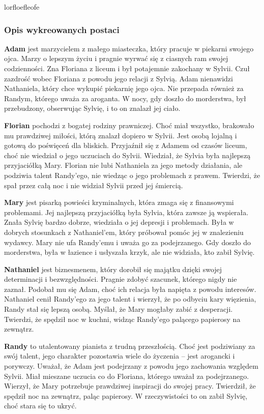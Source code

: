 lorfloefleofe

\subsubsection*{Opis wykreowanych postaci}

\textbf{Adam} jest marzycielem z małego miasteczka, który pracuje w piekarni swojego ojca. Marzy o lepszym 
życiu i pragnie wyrwać się z ciasnych ram swojej codzienności. Zna Floriana z liceum i był 
potajemnie zakochany w Sylvii. Czuł zazdrość wobec Floriana z powodu jego relacji z Sylvią. 
Adam nienawidzi Nathaniela, który chce wykupić piekarnię jego ojca. Nie przepada również za 
Randym, którego uważa za aroganta. W nocy, gdy doszło do morderstwa, był przebudzony, obserwując 
Sylvię, i to on znalazł jej ciało.

\textbf{Florian} pochodzi z bogatej rodziny prawniczej. Choć miał wszystko, brakowało mu prawdziwej miłości, 
którą znalazł dopiero w Sylvii. Jest osobą lojalną i gotową do poświęceń dla bliskich. Przyjaźnił 
się z Adamem od czasów liceum, choć nie wiedział o jego uczuciach do Sylvii. Wiedział, że Sylvia 
była najlepszą przyjaciółką Mary. Florian nie lubi Nathaniela za jego metody działania, ale 
podziwia talent Randy'ego, nie wiedząc o jego problemach z prawem. Twierdzi, że spał przez całą 
noc i nie widział Sylvii przed jej śmiercią.

\textbf{Mary} jest pisarką powieści kryminalnych, która zmaga się z finansowymi problemami. Jej najlepszą 
przyjaciółką była Sylvia, która zawsze ją wspierała. Znała Sylvię bardzo dobrze, wiedziała o jej 
depresji i problemach. Była w dobrych stosunkach z Nathaniel'em, który próbował pomóc jej w 
znalezieniu wydawcy. Mary nie ufa Randy'emu i uważa go za podejrzanego. Gdy doszło do morderstwa, 
była w łazience i usłyszała krzyk, ale nie widziała, kto zabił Sylvię.

\textbf{Nathaniel} jest biznesmenem, który dorobił się majątku dzięki swojej determinacji i bezwzględności. 
Pragnie zdobyć szacunek, którego nigdy nie zaznał. Podobał mu się Adam, choć ich relacja była 
napięta z powodu interesów. Nathaniel cenił Randy'ego za jego talent i wierzył, że po odbyciu kary 
więzienia, Randy stał się lepszą osobą. Myślał, że Mary mogłaby zabić z desperacji. Twierdzi, że 
spędził noc w kuchni, widząc Randy'ego palącego papierosy na zewnątrz.

\textbf{Randy} to utalentowany pianista z trudną przeszłością. Choć jest podziwiany za swój talent, jego 
charakter pozostawia wiele do życzenia – jest arogancki i porywczy. Uważał, że Adam jest podejrzany 
z powodu jego zachowania względem Sylvii. Miał mieszane uczucia co do Floriana, którego uważał za 
podejrzanego. Wierzył, że Mary potrzebuje prawdziwej inspiracji do swojej pracy. Twierdził, że 
spędził noc na zewnątrz, paląc papierosy. W rzeczywistości to on zabił Sylvię, choć stara się to 
ukryć.

